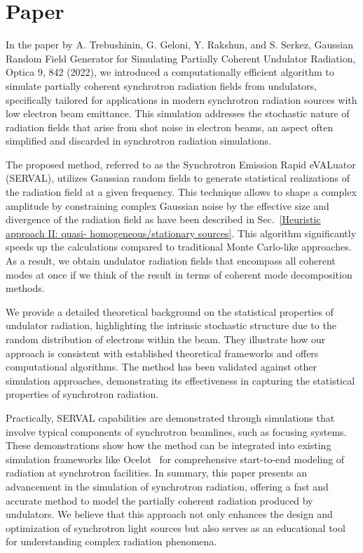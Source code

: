\section{Paper }

    In the paper by A. Trebushinin, G. Geloni, Y. Rakshun, and S. Serkez, Gaussian Random Field Generator for Simulating Partially Coherent Undulator Radiation, Optica 9, 842 (2022),
    we introduced a computationally efficient algorithm to simulate partially coherent synchrotron radiation fields from undulators, specifically tailored for applications in modern synchrotron radiation sources with low electron beam emittance. This simulation addresses the stochastic nature of radiation fields that arise from shot noise in electron beams, an aspect often simplified and discarded in synchrotron radiation simulations.
    
    The proposed method, referred to as the Synchrotron Emission Rapid eVALuator (SERVAL), utilizes Gaussian random fields to generate statistical realizations of the radiation field at a given frequency. This technique allows to shape a complex amplitude by constraining complex Gaussian noise by the effective size and divergence of the radiation field as have been described in Sec.~\ref{Heuristic approach II: quasi- homogeneous/stationary sources}. This algorithm significantly speeds up the calculations compared to traditional Monte Carlo-like approaches. As a result, we obtain undulator radiation fields that encompass all coherent modes at once if we think of the result in terms of coherent mode decomposition methods.
    
    We provide a detailed theoretical background on the statistical properties of undulator radiation, highlighting the intrinsic stochastic structure due to the random distribution of electrons within the beam. They illustrate how our approach is consistent with established theoretical frameworks and offers computational algorithms. The method has been validated against other simulation approaches, demonstrating its effectiveness in capturing the statistical properties of synchrotron radiation.
    
    Practically, SERVAL capabilities are demonstrated through simulations that involve typical components of synchrotron beamlines, such as focusing systems. These demonstrations show how the method can be integrated into existing simulation frameworks like Ocelot~\cite{ocelot-collab_ocelot_2017} for comprehensive start-to-end modeling of radiation at synchrotron facilities. In summary, this paper presents an advancement in the simulation of synchrotron radiation, offering a fast and accurate method to model the partially coherent radiation produced by undulators. We believe that this approach not only enhances the design and optimization of synchrotron light sources but also serves as an educational tool for understanding complex radiation phenomena.

